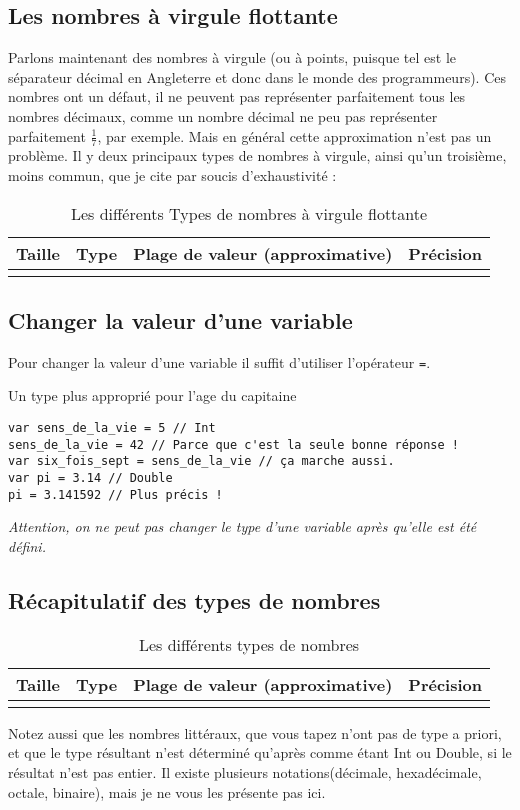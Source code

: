 \subsection{Les nombres à virgule flottante}
Parlons maintenant des nombres à virgule (ou à points, puisque tel est le séparateur décimal en Angleterre et donc dans le monde des programmeurs).
Ces nombres ont un défaut, il ne peuvent pas représenter parfaitement tous les nombres décimaux, comme un nombre décimal ne peu pas représenter parfaitement \begin{math} \frac{1}{7} \end{math}, par exemple. Mais en général cette approximation n'est pas un problème.
Il y deux principaux types de nombres à virgule, ainsi qu'un troisième, moins commun, que je cite par soucis d'exhaustivité :
\begin{longtabu} to \linewidth {|X[3,l,m]|X[1,l,m]|X[4,r,m]|X[3,r,m]|}
\hline Taille & Type & Plage de valeur (approximative) & Précision \\ \hline
\endhead

\caption{Les différents Types de nombres à virgule flottante}
\end{longtabu}

\subsection{Changer la valeur d'une variable}
Pour changer la valeur d'une variable il suffit d'utiliser l'opérateur \verb"=".
\begin{listing}[h]
\caption{Un type plus approprié pour l'age du capitaine}
\begin{verbatim}
var sens_de_la_vie = 5 // Int
sens_de_la_vie = 42 // Parce que c'est la seule bonne réponse !
var six_fois_sept = sens_de_la_vie // ça marche aussi.
var pi = 3.14 // Double
pi = 3.141592 // Plus précis !
\end{verbatim}
\end{listing}

\emph{Attention, on ne peut pas changer le type d'une variable après qu'elle est été défini.}
\subsection{Récapitulatif des types de nombres}
\begin{longtabu} to \linewidth {|X[2,l,m]|X[1,l,m]|X[4,r,m]|X[2,r,m]|}
\hline Taille & Type & Plage de valeur (approximative) & Précision \\ \hline
\endhead


\caption{Les différents types de nombres}
\end{longtabu}
Notez aussi que les nombres littéraux, que vous tapez n'ont pas de type a priori, et que le type résultant n'est déterminé qu'après comme étant Int ou Double, si le résultat n'est pas entier. Il existe plusieurs notations(décimale, hexadécimale, octale, binaire), mais je ne vous les présente pas ici.
